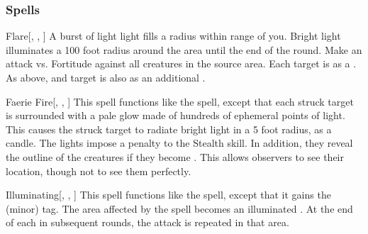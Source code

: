 \subsubsection{Spells}


\lowercase{\hypertarget{spell:Flare}{}}\label{spell:Flare}
\begin{apability}[\nth{1}]{\hypertarget{spell:Flare}{Flare}}[, , ]
A burst of light light fills a \areasmall radius within \rngmed range of you.
Bright light illuminates a 100 foot radius around the area until the end of the round.
Make an attack vs. Fortitude against all creatures in the source area.
\hit Each target is \dazzled as a .
\crit As above, and target is also \dazed as an additional .
\end{apability}
\vspace{0.25em}



\lowercase{\hypertarget{spell:Faerie Fire}{}}\label{spell:Faerie Fire}
\begin{apability}[\nth{2}]{\hypertarget{spell:Faerie Fire}{Faerie Fire}}[, , ]
This spell functions like the  spell, except that each struck target is surrounded with a pale glow made of hundreds of ephemeral points of light.
This causes the struck target to radiate bright light in a 5 foot radius, as a candle.
The lights impose a  penalty to the Stealth skill.
In addition, they reveal the outline of the creatures if they become .
This allows observers to see their location, though not to see them perfectly.
\end{apability}
\vspace{0.25em}



\lowercase{\hypertarget{spell:Illuminating}{}}\label{spell:Illuminating}
\begin{apability}[\nth{2}]{\hypertarget{spell:Illuminating}{Illuminating}}[, , ]
This spell functions like the  spell, except that it gains the  (minor) tag.
The area affected by the spell becomes an illuminated .
At the end of each  in subsequent rounds, the attack is repeated in that area.
\end{apability}
\vspace{0.25em}



